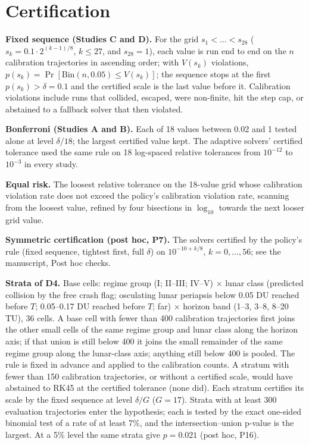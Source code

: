 \documentclass[10pt,letterpaper]{article}
\begin{document}
\section{Certification}
\label{sec:cert}
\textbf{Fixed sequence (Studies C and D).} For the grid $s_1 < \dots < s_{28}$ ($s_k = 0.1\cdot2^{(k-1)/8}$, $k \le 27$, and $s_{28} = 1$), each value is
run end to end on the $n$ calibration trajectories in ascending order; with $V(s_k)$ violations, $p(s_k) = \Pr[\mathrm{Bin}(n, 0.05) \le V(s_k)]$; the
sequence stops at the first $p(s_k) > \delta = 0.1$ and the certified scale is the last value before it. Calibration violations include runs that
collided, escaped, were non-finite, hit the step cap, or abstained to a fallback solver that then violated.

\textbf{Bonferroni (Studies A and B).} Each of 18 values between 0.02 and 1 tested alone at level $\delta/18$; the largest certified value kept. The
adaptive solvers' certified tolerance used the same rule on 18 log-spaced relative tolerances from $10^{-12}$ to $10^{-3}$ in every study.

\textbf{Equal risk.} The loosest relative tolerance on the 18-value grid whose calibration violation rate does not exceed the policy's calibration
violation rate, scanning from the loosest value, refined by four bisections in $\log_{10}$ towards the next looser grid value.

\textbf{Symmetric certification (post hoc, P7).} The solvers certified by the policy's rule (fixed sequence, tightest first, full $\delta$) on
$10^{-10+k/8}$, $k = 0,\dots,56$; see the manuscript, Post hoc checks.

\textbf{Strata of D4.} Base cells: regime group (I; II--III; IV--V) $\times$ lunar class (predicted collision by the free crash flag; osculating lunar
periapsis below 0.05 DU reached before $T$; 0.05--0.17 DU reached before $T$; far) $\times$ horizon band (1--3, 3--8, 8--20 TU), 36 cells. A base
cell with fewer than 400 calibration trajectories first joins the other small cells of the same regime group and lunar class along the horizon
axis; if that union is still below 400 it joins the small remainder of the same regime group along the lunar-class axis; anything still below 400
is pooled. The rule is fixed in advance and applied to the calibration counts. A stratum with fewer than 150 calibration trajectories, or without
a certified scale, would have abstained to RK45 at the certified tolerance (none did). Each stratum certifies its scale by the fixed sequence at
level $\delta/G$ ($G = 17$). Strata with at least 300 evaluation trajectories enter the hypothesis; each is tested by the exact one-sided binomial
test of a rate of at least 7\%, and the intersection--union p-value is the largest. At a 5\% level the same strata give $p = 0.021$ (post hoc, P16).
\end{document}
